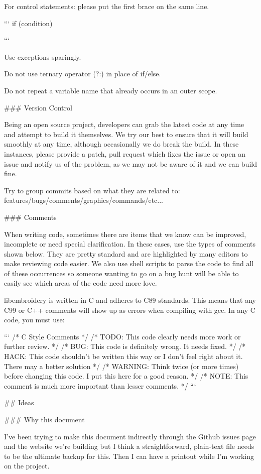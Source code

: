For control statements: please put the first brace on the same line.

```
if (condition) {

}
```

Use exceptions sparingly.

Do not use ternary operator (?:) in place of if/else.

Do not repeat a variable name that already occurs in an outer scope.

### Version Control

Being an open source project, developers can grab the latest code at any
time and attempt to build it themselves. We try our best to ensure that
it will build smoothly at any time, although occasionally we do break
the build. In these instances, please provide a patch, pull request
which fixes the issue or open an issue and notify us of the problem, as
we may not be aware of it and we can build fine.

Try to group commits based on what they are related to:
features/bugs/comments/graphics/commands/etc...

### Comments

When writing code, sometimes there are items that we know can be
improved, incomplete or need special clarification. In these cases, use
the types of comments shown below. They are pretty standard and are
highlighted by many editors to make reviewing code easier. We also use
shell scripts to parse the code to find all of these occurrences so
someone wanting to go on a bug hunt will be able to easily see which
areas of the code need more love.

libembroidery is written in C and adheres to C89 standards. This means
that any C99 or C++ comments will show up as errors when compiling with
gcc. In any C code, you must use:

```
/* C Style Comments */
/* TODO: This code clearly needs more work or further review. */
/* BUG: This code is definitely wrong. It needs fixed. */
/* HACK: This code shouldn't be written this way or I don't feel right about it. There may a better solution */
/* WARNING: Think twice (or more times) before changing this code. I put this here for a good reason. */
/* NOTE: This comment is much more important than lesser comments. */
```

## Ideas

### Why this document

I've been trying to make this document indirectly through the Github
issues page and the website we're building but I think a
straightforward, plain-text file needs to be the ultimate backup for
this. Then I can have a printout while I'm working on the project.

